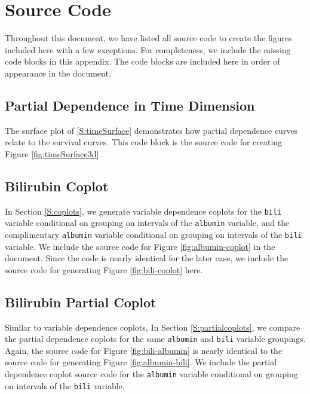 \documentclass[article]{jss}
\begin{document}
\appendix

\section{Source Code}\label{source-code}

Throughout this document, we have listed all  source code to
create the figures included here with a few exceptions. For
completeness, we include the missing code blocks in this appendix. The
code blocks are included here in order of appearance in the document.

\subsection{Partial Dependence in Time
Dimension}\label{partial-dependence-in-time-dimension}

The surface plot of \ref{S:timeSurface} demonstrates how partial
dependence curves relate to the survival curves. This code block is the
 source code for creating Figure \ref{fig:timeSurface3d}.

\subsection{Bilirubin Coplot}\label{bilirubin-coplot}

In Section \ref{S:coplots}, we generate variable dependence coplots for
the \texttt{bili} variable conditional on grouping on intervals of the
\texttt{albumin} variable, and the complimentary \texttt{albumin}
variable conditional on grouping on intervals of the \texttt{bili}
variable. We include the source code for Figure \ref{fig:albumin-coplot}
in the document. Since the code is nearly identical for the later case,
we include the source code for generating Figure \ref{fig:bili-coplot}
here.

\subsection{Bilirubin Partial Coplot}\label{bilirubin-partial-coplot}

Similar to variable dependence coplots, In Section
\ref{S:partialcoplots}, we compare the partial dependence coplots for
the same \texttt{albumin} and \texttt{bili} variable groupings. Again,
the source code for Figure \ref{fig:bili-albumin} is nearly identical to
the source code for generating Figure \ref{fig:albumin-bili}. We include
the partial dependence coplot source code for the \texttt{albumin}
variable conditional on grouping on intervals of the \texttt{bili}
variable.
\end{document}
